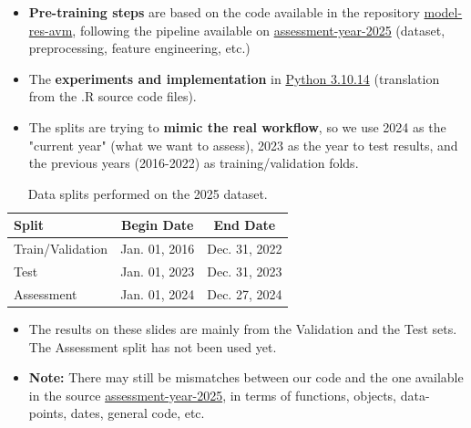 \documentclass[aspectratio=169,10pt]{beamer}
\begin{document}
\begin{frame}{\sectionAA}


\begin{itemize}
    \item  \textbf{Pre-training steps} are based on the code available in the repository \href{https://github.com/ccao-data/model-res-avm/tree/master}{\color{blue} model-res-avm}, following the pipeline available on \href{https://github.com/ccao-data/model-res-avm/tree/2025-assessment-year/pipeline}{\color{blue} assessment-year-2025} (dataset, preprocessing, feature engineering, etc.) 

    \item The \textbf{experiments and implementation} in \href{https://www.python.org/downloads/release/python-31014/}{\color{blue} Python 3.10.14} (translation from the .R source code files).

    \item The splits are trying to \textbf{mimic the real workflow}, so we use 2024 as the "current year" (what we want to assess), 2023 as the year to test results, and the previous years (2016-2022) as training/validation folds. 
\end{itemize}
\vspace{-3mm}
    \begin{table}[]
        \centering
        \caption{Data splits performed on the 2025 dataset.}
        \vspace{-1mm}
        \begin{tabular}{l|c|c}
        \toprule
           \textbf{Split}  & \textbf{Begin Date} & \textbf{End Date}  \\
           \midrule
           Train/Validation  &  Jan. 01, 2016 &  Dec. 31, 2022 \\  
           Test & Jan. 01, 2023 & Dec. 31, 2023 \\
           Assessment & Jan. 01, 2024 & Dec. 27, 2024 \\
           \bottomrule
        \end{tabular}
    \end{table}

    \begin{itemize}
        \item 
The results on these slides are mainly from the Validation and the Test sets. The Assessment split has not been used yet. 

\item {} \textbf{Note:} There may still be mismatches between our code and the one available in the source \href{https://github.com/ccao-data/model-res-avm/tree/2025-assessment-year/pipeline}{\color{blue} assessment-year-2025}, in terms of functions, objects, data-points, dates, general code, etc.
    \end{itemize}





\medskip

 


\end{frame}
\end{document}
